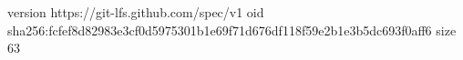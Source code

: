 version https://git-lfs.github.com/spec/v1
oid sha256:fcfef8d82983e3cf0d5975301b1e69f71d676df118f59e2b1e3b5dc693f0aff6
size 63
